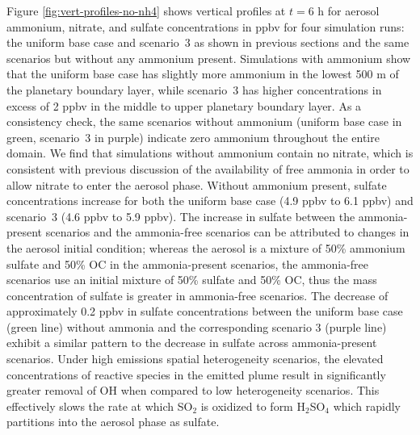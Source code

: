 Figure \ref{fig:vert-profiles-no-nh4} shows vertical profiles at $t=6$ h for aerosol ammonium, nitrate, and sulfate concentrations in ppbv for four simulation runs: the uniform base case and scenario~3 as shown in previous sections and the same scenarios but without any ammonium present. Simulations with ammonium show that the uniform base case has slightly more ammonium in the lowest 500 m of the planetary boundary layer, while scenario~3 has higher concentrations in excess of 2 ppbv in the middle to upper planetary boundary layer. As a consistency check, the same scenarios without ammonium (uniform base case in green, scenario~3 in purple) indicate zero ammonium throughout the entire domain. We find that simulations without ammonium contain no nitrate, which is consistent with previous discussion of the availability of free ammonia in order to allow nitrate to enter the aerosol phase. Without ammonium present, sulfate concentrations increase for both the uniform base case (4.9 ppbv to 6.1 ppbv) and scenario~3 (4.6 ppbv to 5.9 ppbv). The increase in sulfate between the ammonia-present scenarios and the ammonia-free scenarios can be attributed to changes in the aerosol initial condition; whereas the aerosol is a mixture of 50\% ammonium sulfate and 50\% OC in the ammonia-present scenarios, the ammonia-free scenarios use an initial mixture of 50\% sulfate and 50\% OC, thus the mass concentration of sulfate is greater in ammonia-free scenarios. The decrease of approximately 0.2 ppbv in sulfate concentrations between the uniform base case (green line) without ammonia and the corresponding scenario 3 (purple line) exhibit a similar pattern to the decrease in sulfate across ammonia-present scenarios. Under high emissions spatial heterogeneity scenarios, the elevated concentrations of reactive species in the emitted plume result in significantly greater removal of OH when compared to low heterogeneity scenarios. This effectively slows the rate at which SO$_2$ is oxidized to form H$_2$SO$_4$ which rapidly partitions into the aerosol phase as sulfate. 

